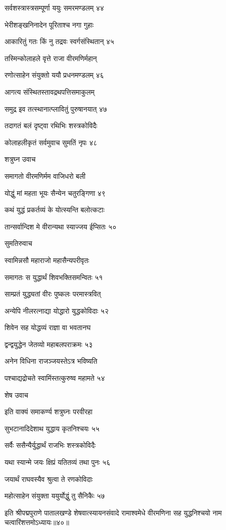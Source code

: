 सर्वशस्त्रास्त्रसम्पूर्णा ययुः समरमण्डलम् ४४

भेरीशङ्खनिनादेन पूरिताश्च नगा गुहाः

आकारितुं गतः किं नु तद्रवः स्वर्गसंस्थितान् ४५

तस्मिन्कोलाहले वृत्ते राजा वीरमणिर्महान्

रणोत्साहेन संयुक्तो ययौ प्रधनमण्डलम् ४६

आगत्य संस्थितस्तावद्रथपत्तिसमाकुलम्

समुद्र इव तत्स्थानात्प्लावितुं पुरुषानयात् ४७

तदागतं बलं दृष्ट्वा रथिभिः शस्त्रकोविदैः

कोलाहलीकृतं सर्वमुवाच सुमतिं नृपः ४८

शत्रुघ्न उवाच

समागतो वीरमणिर्मम वाजिधरो बली

योद्धुं मां महता भूयः सैन्येन चतुरङ्गिणा ४९

कथं युद्धं प्रकर्तव्यं के योत्स्यन्ति बलोत्कटाः

तान्सर्वान्दिश मे वीरान्यथा स्याज्जय ईप्सितः ५०

सुमतिरुवाच

स्वामिन्नसौ महाराजो महासैन्यपरीवृतः

समागतः स युद्धार्थं शिवभक्तिसमन्वितः ५१

साम्प्रतं युद्ध्यतां वीरः पुष्कलः परमास्त्रवित्

अन्येपि नीलरत्नाद्या योद्धारो युद्धकोविदाः ५२

शिवेन सह योद्धव्यं राज्ञा वा भवतानघ

द्वन्द्वयुद्धेन जेतव्यो महाबलपराक्रमः ५३

अनेन विधिना राजञ्जयस्तेऽत्र भविष्यति

पश्चाद्यद्रोचते स्वामिंस्तत्कुरुष्व महामते ५४

शेष उवाच

इति वाक्यं समाकर्ण्य शत्रुघ्नः परवीरहा

सुभटानादिदेशाथ युद्धाय कृतनिश्चयः ५५

सर्वैः ससैन्यैर्युद्धार्थं राजभिः शस्त्रकोविदैः

यथा स्यान्मे जयः क्षिप्रं यतितव्यं तथा पुनः ५६

जयार्थं राघवस्यैव श्रुत्वा ते रणकोविदाः

महोत्साहेन संयुक्ता ययुर्योद्धुं तु सैनिकैः ५७

इति श्रीपद्मपुराणे पातालखण्डे शेषवात्स्यायनसंवादे रामाश्वमेधे वीरमणिना सह युद्धनिश्चयो नाम चत्वारिंशत्तमोऽध्यायः॥४०॥


